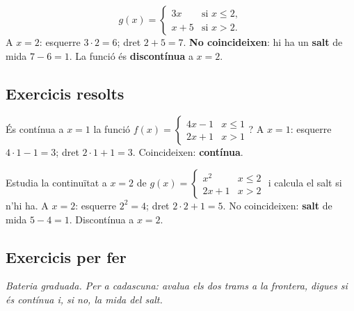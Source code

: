 \begin{exemple}
\[
g(x)=
\begin{cases}
3x & \text{si } x\le 2,\\[2pt]
x+5 & \text{si } x>2.
\end{cases}
\]
A $x=2$: esquerre $3\cdot 2=6$; dret $2+5=7$. \textbf{No coincideixen}: hi ha un
\textbf{salt} de mida $7-6=1$. La funció és \textbf{discontínua} a $x=2$.
\end{exemple}

\subsection{Exercicis resolts}

\begin{exresolt}
És contínua a $x=1$ la funció
$f(x)=\begin{cases}4x-1 & x\le 1\\ 2x+1 & x>1\end{cases}$?
\solucio
A $x=1$: esquerre $4\cdot 1-1=3$; dret $2\cdot 1+1=3$. Coincideixen: \textbf{contínua}.
\end{exresolt}

\begin{exresolt}
Estudia la continuïtat a $x=2$ de
$g(x)=\begin{cases}x^2 & x\le 2\\ 2x+1 & x>2\end{cases}$ i calcula el salt si n'hi ha.
\solucio
A $x=2$: esquerre $2^2=4$; dret $2\cdot 2+1=5$. No coincideixen: \textbf{salt} de mida
$5-4=1$. Discontínua a $x=2$.
\end{exresolt}

\subsection{Exercicis per fer}

\noindent\textit{Bateria graduada. Per a cadascuna: avalua els dos trams a la frontera,
digues si és contínua i, si no, la mida del salt.}

